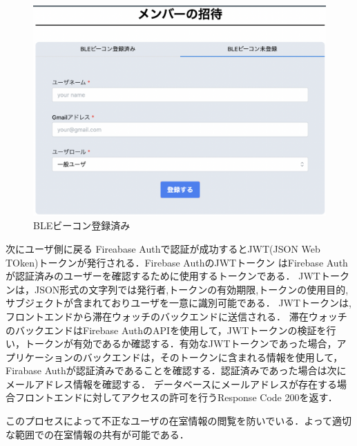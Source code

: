 \begin{figure}[tbh]
  \centering
  \includegraphics[width=16cm]{image/registerNotBLE.png}
  \caption{BLEビーコン登録済み}
  \label{multipleBPM}
\end{figure}



次にユーザ側に戻る
Fireabase Authで認証が成功するとJWT(JSON Web TOken)トークンが発行される．Firebase AuthのJWTトークン はFirebase Authが認証済みのユーザーを確認するために使用するトークンである．
JWTトークンは，JSON形式の文字列では発行者,トークンの有効期限,トークンの使用目的,サブジェクトが含まれておりユーザを一意に識別可能である．
JWTトークンは,フロントエンドから滞在ウォッチのバックエンドに送信される．
滞在ウォッチのバックエンドはFirebase AuthのAPIを使用して，JWTトークンの検証を行い，トークンが有効であるか確認する．有効なJWTトークンであった場合，アプリケーションのバックエンドは，そのトークンに含まれる情報を使用して，Firabase Authが認証済みであることを確認する．認証済みであった場合は次にメールアドレス情報を確認する．
データベースにメールアドレスが存在する場合フロントエンドに対してアクセスの許可を行うResponse Code 200を返す．

このプロセスによって不正なユーザの在室情報の閲覧を防いでいる．よって適切な範囲での在室情報の共有が可能である．






